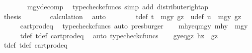 \begin{isabellebody}
\ \ \ \ \ \ \isamarkupfalse%
\ mgy{\isacharunderscore}{\kern0pt}decomp\ \isamarkupfalse%
\ {\isacharparenleft}{\kern0pt}typecheck{\isacharunderscore}{\kern0pt}cfuncs{\isacharcomma}{\kern0pt}\ simp\ add{\isacharcolon}{\kern0pt}\ distribute{\isacharunderscore}{\kern0pt}right{\isacharunderscore}{\kern0pt}ap{\isacharparenright}{\kern0pt}\isanewline
\ \ \ \ \isamarkupfalse%
\ \isamarkupfalse%
\ {\isacharquery}{\kern0pt}thesis\isanewline
\ \ \ \ \ \ \isamarkupfalse%
\ calculation\ \isamarkupfalse%
\ auto\isanewline
\ \ \isamarkupfalse%
\isanewline
\ \ \isamarkupfalse%
\ \isamarkupfalse%
\ t{\isacharunderscore}{\kern0pt}def{}{\isacharcolon}{\kern0pt}\ {\isachardoublequoteopen}t\ {\isacharequal}{\kern0pt}\ {\isasymlangle}mgy{}{\isacharcomma}{\kern0pt}\ gz{\isasymrangle}{\isachardoublequoteclose}\ \ u{\isacharunderscore}{\kern0pt}def{\isacharcolon}{\kern0pt}\ {\isachardoublequoteopen}u\ {\isacharequal}{\kern0pt}\ {\isasymlangle}mgy{}{\isacharcomma}{\kern0pt}\ gz{\isasymrangle}{\isachardoublequoteclose}\isanewline
\ \ \ \ \isamarkupfalse%
\ cart{\isacharunderscore}{\kern0pt}prod{\isacharunderscore}{\kern0pt}eq{}\ \isamarkupfalse%
\ {\isacharparenleft}{\kern0pt}typecheck{\isacharunderscore}{\kern0pt}cfuncs{\isacharcomma}{\kern0pt}\ auto{\isacharcomma}{\kern0pt}\ presburger{\isacharparenright}{\kern0pt}\isanewline
\isanewline
\ \ \isamarkupfalse%
\ mhy{}{\isacharunderscore}{\kern0pt}eq{\isacharunderscore}{\kern0pt}mgy{}{\isacharcolon}{\kern0pt}\ {\isachardoublequoteopen}mhy{}\ {\isacharequal}{\kern0pt}\ mgy{}{\isachardoublequoteclose}\isanewline
\ \ \ \ \isamarkupfalse%
\ t{\isacharunderscore}{\kern0pt}def{}\ t{\isacharunderscore}{\kern0pt}def\ cart{\isacharunderscore}{\kern0pt}prod{\isacharunderscore}{\kern0pt}eq{}\ \isamarkupfalse%
\ {\isacharparenleft}{\kern0pt}auto{\isacharcomma}{\kern0pt}\ typecheck{\isacharunderscore}{\kern0pt}cfuncs{\isacharparenright}{\kern0pt}\isanewline
\ \ \isamarkupfalse%
\ gy{\isacharunderscore}{\kern0pt}eq{\isacharunderscore}{\kern0pt}gz{\isacharcolon}{\kern0pt}\ {\isachardoublequoteopen}hz\ {\isacharequal}{\kern0pt}\ gz{\isachardoublequoteclose}\isanewline
\ \ \ \ \isamarkupfalse%
\ t{\isacharunderscore}{\kern0pt}def{}\ t{\isacharunderscore}{\kern0pt}def\ cart{\isacharunderscore}{\kern0pt}prod{\isacharunderscore}{\kern0pt}eq{}\ \isamarkupfalse%

\end{isabellebody}
